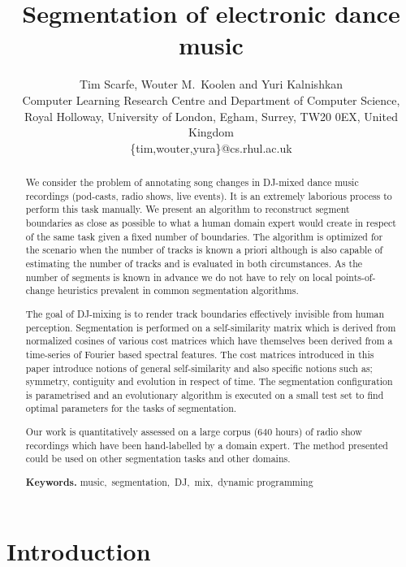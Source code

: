 \documentclass[twocolumn]{article}
\author{Tim Scarfe, Wouter M.~Koolen and Yuri Kalnishkan \\ 
	Computer Learning Research
	Centre and Department of Computer Science, \\ 
	Royal Holloway,  University of London, Egham, Surrey, TW20 0EX, United Kingdom\\
	\{tim,wouter,yura\}@cs.rhul.ac.uk
}
\title{Segmentation of electronic dance music}
\begin{document}
	
	\maketitle
	
	\begin{abstract}
		
We consider the problem of annotating song changes in DJ-mixed dance music recordings (pod-casts, radio shows, live events). It is an extremely laborious process to perform this task manually. We present an algorithm to reconstruct segment boundaries as close as possible to what a human domain expert would create in respect of the same task given a fixed number of boundaries. The algorithm is optimized for the scenario when the number of tracks is known a priori although is also capable of estimating the number of tracks and is evaluated in both circumstances. As the number of segments is known in advance we do not have to rely on local points-of-change heuristics prevalent in common segmentation algorithms. 

The goal of DJ-mixing is to render track boundaries effectively invisible from human perception. Segmentation is performed on a self-similarity matrix which is derived from normalized cosines of various cost matrices which have themselves been derived from a time-series of Fourier based spectral features. The cost matrices introduced in this paper introduce notions of general self-similarity and also specific notions such as; symmetry, contiguity and evolution in respect of time. The segmentation configuration is parametrised and an evolutionary algorithm is executed on a small test set to find optimal parameters for the tasks of segmentation. 

Our work is quantitatively assessed on a large corpus ($640$ hours) of radio show recordings which have been hand-labelled by a domain expert. The method presented could be used on other segmentation tasks and other domains. 
		\smallskip
		
		\noindent \textbf{Keywords.} \noindent music,~segmentation,~DJ,~mix,~dynamic programming
		
	\end{abstract}
	
	
	\vspace{1em}
	
	\section{Introduction}
	
\end{document}
